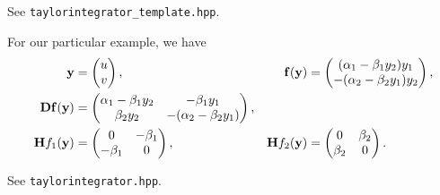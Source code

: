 \begin{problem}
\begin{subproblem}[4]
\begin{hint}
 See \verb|taylorintegrator_template.hpp|.
\end{hint}

\cprotEnv \begin{solution}
 For our particular example, we have
  \begin{align*}
    {\mathbf{y}} &=        \begin{pmatrix}      u\\      v    \end{pmatrix},
    &{\mathbf{f}}({\mathbf{y}}) &=    \begin{pmatrix}      (\alpha_1 - \beta_1y_2)y_1\\      -(\alpha_2 - \beta_2y_1)y_2    \end{pmatrix},\\
    {\mathbf{D}}{\mathbf{f}}({\mathbf{y}}) &=    \begin{pmatrix}      \alpha_1 - \beta_1y_2 & -\beta_1y_1\\      \beta_2y_2 &-(\alpha_2 - \beta_2y_1)    \end{pmatrix},&&\\
    {\mathbf{H}} f_1({\mathbf{y}}) &=  \begin{pmatrix}      0 & -\beta_1\\      -\beta_1 & 0    \end{pmatrix},
    &{\mathbf{H}} f_2({\mathbf{y}}) &= \begin{pmatrix}      0 & \beta_2\\      \beta_2 & 0    \end{pmatrix}.
  \end{align*}
  
 See \verb|taylorintegrator.hpp|.
% 
% 
% 
\end{solution}
\end{subproblem}


\end{problem}
